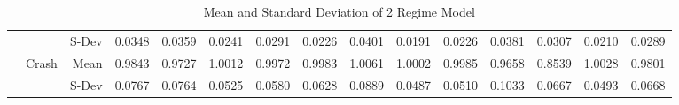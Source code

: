 \documentclass[12pt, a4paper, oneside]{article} %
\begin{document}
\begin{landscape}
\begin{table}[ht]
\begin{tabular}{llrrrrrrrrrrrrr}
 & & S-Dev &0.0348 & 0.0359 & 0.0241 & 0.0291 & 0.0226 & 0.0401 & 0.0191 & 0.0226 & 0.0381 & 0.0307 & 0.0210 & 0.0289 \\ 
  & \multirow{2}{*}{Crash}&Mean & 0.9843 & 0.9727 & 1.0012 & 0.9972 & 0.9983 & 1.0061 & 1.0002 & 0.9985 & 0.9658 & 0.8539 & 1.0028 & 0.9801 \\ 
  & & S-Dev& 0.0767 & 0.0764 & 0.0525 & 0.0580 & 0.0628 & 0.0889 & 0.0487 & 0.0510 & 0.1033 & 0.0667 & 0.0493 & 0.0668 \\ 
   \hline
\end{tabular}
\caption{Mean and Standard Deviation of 2 Regime Model}
\end{table}
\label{tabref:2StateProb}
\end{landscape}

\end{document}
